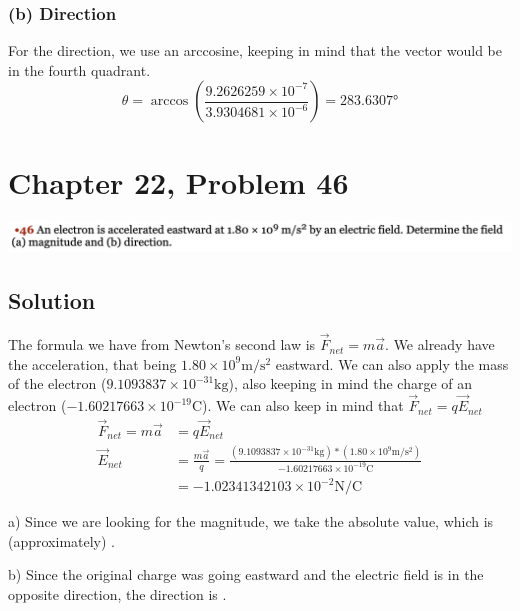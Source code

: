 \documentclass[12pt]{article}
\begin{document}
\subsubsection*{(b) Direction}
For the direction, we use an arccosine, keeping in mind that the vector would be in the fourth quadrant. 
\begin{equation*}
    \theta = \arccos\left(\frac{9.2626259 \times 10^{-7}}{3.9304681 \times 10^{-6}}\right)
        =   \boxed{283.6307 \unit{\degree}}
\end{equation*}


\pagebreak
\section*{Chapter 22, Problem 46}
\includegraphics[width=\textwidth]{picture_7.png}

\subsection*{Solution}
The formula we have from Newton's second law is $\vec{F}_{net} = m\vec{a}$. We already have the acceleration, that being $1.80 \times 10^9 \unit{\meter/\second^2}$ eastward. We can also apply the mass of the electron ($9.1093837 \times 10^{-31} \unit{\kilo\gram}$), also keeping in mind the charge of an electron ($-1.60217663 \times 10^{-19} \unit{\coulomb}$). We can also keep in mind that $\vec{F}_{net} = q \vec{E}_{net}$
\begin{align*}
    \vec{F}_{net}   =   m\vec{a}
        &=  q \vec{E}_{net}\\
    \vec{E}_{net}   &=  \frac{m\vec{a}}{q}
        =   \frac{(9.1093837 \times 10^{-31} \unit{\kilo\gram})*(1.80 \times 10^9 \unit{\meter/\second^2})}{-1.60217663 \times 10^{-19} \unit{\coulomb}}\\
        &=  -1.02341342103 \times 10^{-2} \unit{\newton/\coulomb}
\end{align*}

a) Since we are looking for the magnitude, we take the absolute value, which is (approximately) .

b) Since the original charge was going eastward and the electric field is in the opposite direction, the direction is .
\end{document}

